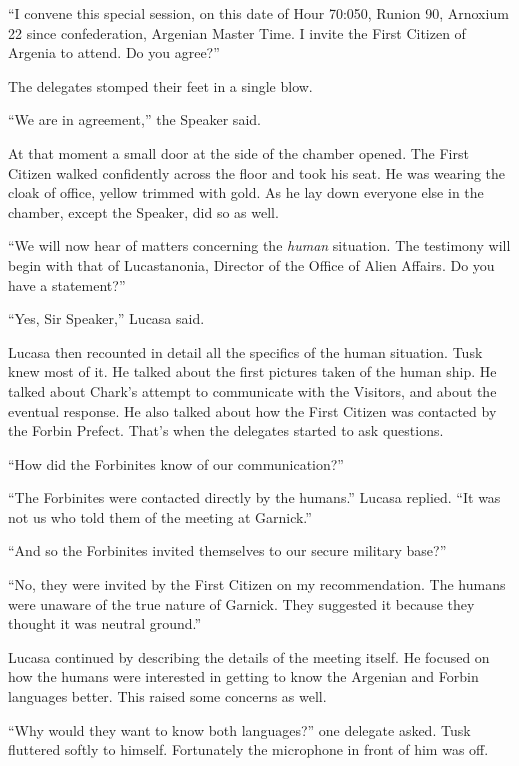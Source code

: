 ``I convene this special session, on this date of Hour 70:050, Runion 90, Arnoxium 22 since
confederation, Argenian Master Time. I invite the First Citizen of Argenia to attend. Do you
agree?''

The delegates stomped their feet in a single blow.

``We are in agreement,'' the Speaker said.

At that moment a small door at the side of the chamber opened. The First Citizen walked
confidently across the floor and took his seat. He was wearing the cloak of office, yellow
trimmed with gold. As he lay down everyone else in the chamber, except the Speaker, did so as
well.


``We will now hear of matters concerning the \textit{human} situation. The testimony will begin
with that of Lucastanonia, Director of the Office of Alien Affairs. Do you have a statement?''

``Yes, Sir Speaker,'' Lucasa said.

Lucasa then recounted in detail all the specifics of the human situation. Tusk knew most of it.
He talked about the first pictures taken of the human ship. He talked about Chark's attempt to
communicate with the Visitors, and about the eventual response. He also talked about how the
First Citizen was contacted by the Forbin Prefect. That's when the delegates started to ask
questions.

``How did the Forbinites know of our communication?''

``The Forbinites were contacted directly by the humans.'' Lucasa replied. ``It was not us who
told them of the meeting at Garnick.''

``And so the Forbinites invited themselves to our secure military base?''

``No, they were invited by the First Citizen on my recommendation. The humans were unaware of
the true nature of Garnick. They suggested it because they thought it was neutral ground.''

Lucasa continued by describing the details of the meeting itself. He focused on how the humans
were interested in getting to know the Argenian and Forbin languages better. This raised some
concerns as well.

``Why would they want to know both languages?'' one delegate asked. Tusk fluttered softly to
himself. Fortunately the microphone in front of him was off.


